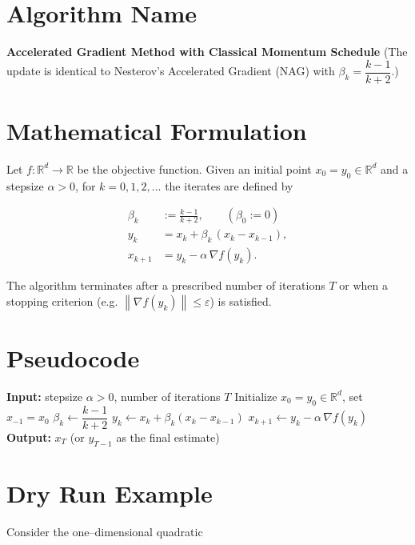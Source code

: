 \documentclass{article}
\newcommand{\grad}{\nabla}
\newcommand{\R}{\mathbb{R}}
\newcommand{\norm}[1]{\left\|#1\right\|}
\begin{document}
\section*{Algorithm Name}
\textbf{Accelerated Gradient Method with Classical Momentum Schedule}  
(The update is identical to Nesterov’s Accelerated Gradient (NAG) with
\(\beta_k=\dfrac{k-1}{k+2}\).)

\section*{Mathematical Formulation}
Let \(f:\R^d\to\R\) be the objective function.
Given an initial point \(x_{0}=y_{0}\in\R^{d}\) and a stepsize \(\alpha>0\), for
\(k=0,1,2,\dots\) the iterates are defined by  

\[
\begin{aligned}
\beta_k &:= \frac{k-1}{k+2}, \qquad (\beta_0:=0)\\[4pt]
y_k    &= x_k + \beta_k\,(x_k-x_{k-1}), \\[4pt]
x_{k+1}&= y_k - \alpha\,\grad f(y_k).
\end{aligned}
\tag{1}
\]

The algorithm terminates after a prescribed number of iterations
\(T\) or when a stopping criterion (e.g. \(\norm{\grad f(y_k)}\le \varepsilon\))
is satisfied.

\section*{Pseudocode}
\begin{algorithm}[H]
\caption{Accelerated Gradient (AG) with \(\beta_k=\frac{k-1}{k+2}\)}
\begin{algorithmic}[1]
\State \textbf{Input:} stepsize \(\alpha>0\), number of iterations \(T\)
\State Initialize \(x_{0}=y_{0}\in\R^{d}\), set \(x_{-1}=x_{0}\)
    \State \(\beta_k \gets \dfrac{k-1}{k+2}\)   
    \State \(y_k \gets x_k + \beta_k (x_k - x_{k-1})\)
    \State \(x_{k+1} \gets y_k - \alpha \,\grad f(y_k)\)
\EndFor
\State \textbf{Output:} \(x_T\) (or \(y_{T-1}\) as the final estimate)
\end{algorithmic}
\end{algorithm}

\section*{Dry Run Example}
Consider the one–dimensional quadratic  
\end{document}
